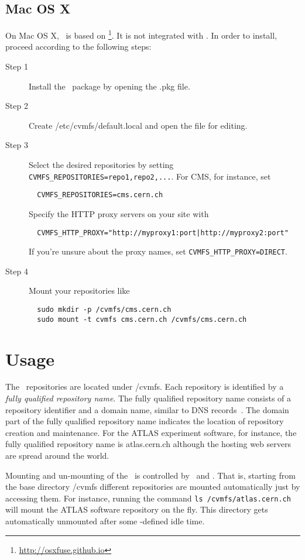 \subsection{Mac OS X}
On Mac OS X, \cvmfs\ is based on \osxfuse\footnote{\url{http://osxfuse.github.io}}. 
It is not integrated with \autofs.
In order to install, proceed according to the following steps:
\begin{description}
	\item[Step 1] Install the \cvmfs\ package by opening the .pkg file.
	\item[Step 2] Create /etc/cvmfs/default.local and open the file for editing.
	\item[Step 3] Select the desired repositories by setting \texttt{CVMFS\_REPOSITORIES=repo1,repo2,...}.
		For CMS, for instance, set 
\begin{verbatim}
  CVMFS_REPOSITORIES=cms.cern.ch
\end{verbatim}
		Specify the HTTP proxy servers on your site with
\begin{verbatim}
  CVMFS_HTTP_PROXY="http://myproxy1:port|http://myproxy2:port"
\end{verbatim}
	If you're unsure about the proxy names, set \texttt{CVMFS\_HTTP\_PROXY=DIRECT}.
    \item[Step 4] Mount your repositories like
\begin{verbatim} 
  sudo mkdir -p /cvmfs/cms.cern.ch
  sudo mount -t cvmfs cms.cern.ch /cvmfs/cms.cern.ch
\end{verbatim}
\end{description}

\section{Usage}
The \cvmfs\ repositories are located under /cvmfs.
Each repository is identified by a \emph{fully qualified repository name}.
The fully qualified repository name consists of a repository identifier and a domain name, similar to DNS records~\cite{rfc1035}.
The domain part of the fully qualified repository name indicates the location of repository creation and maintenance.
For the ATLAS experiment software, for instance, the fully qualified repository name is atlas.cern.ch although the hosting web servers are spread around the world.

Mounting and un-mounting of the \cvmfs\ is controlled by \autofs\ and .
That is, starting from the base directory /cvmfs different repositories are mounted automatically just by accessing them.
For instance, running the command \texttt{ls /cvmfs/atlas.cern.ch} will mount the ATLAS software repository on the fly.
This directory gets automatically unmounted after some -defined idle time.

